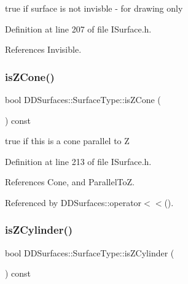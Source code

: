 true if surface is not invisble -\/ for drawing only 



Definition at line 207 of file I\+Surface.\+h.



References Invisible.

\hypertarget{class_d_d_surfaces_1_1_surface_type_adfc3a03efefec5734e96647ad38be341}{}\label{class_d_d_surfaces_1_1_surface_type_adfc3a03efefec5734e96647ad38be341} 
\subsubsection{\texorpdfstring{is\+Z\+Cone()}{isZCone()}}
{\footnotesize\ttfamily bool D\+D\+Surfaces\+::\+Surface\+Type\+::is\+Z\+Cone (\begin{DoxyParamCaption}{ }\end{DoxyParamCaption}) const\hspace{0.3cm}{\ttfamily [inline]}}



true if this is a cone parallel to Z 



Definition at line 213 of file I\+Surface.\+h.



References Cone, and Parallel\+ToZ.



Referenced by D\+D\+Surfaces\+::operator$<$$<$().

\hypertarget{class_d_d_surfaces_1_1_surface_type_a28938c3a776ef5541e0c1eeb41873d00}{}\label{class_d_d_surfaces_1_1_surface_type_a28938c3a776ef5541e0c1eeb41873d00} 
\subsubsection{\texorpdfstring{is\+Z\+Cylinder()}{isZCylinder()}}
{\footnotesize\ttfamily bool D\+D\+Surfaces\+::\+Surface\+Type\+::is\+Z\+Cylinder (\begin{DoxyParamCaption}{ }\end{DoxyParamCaption}) const\hspace{0.3cm}{\ttfamily [inline]}}



